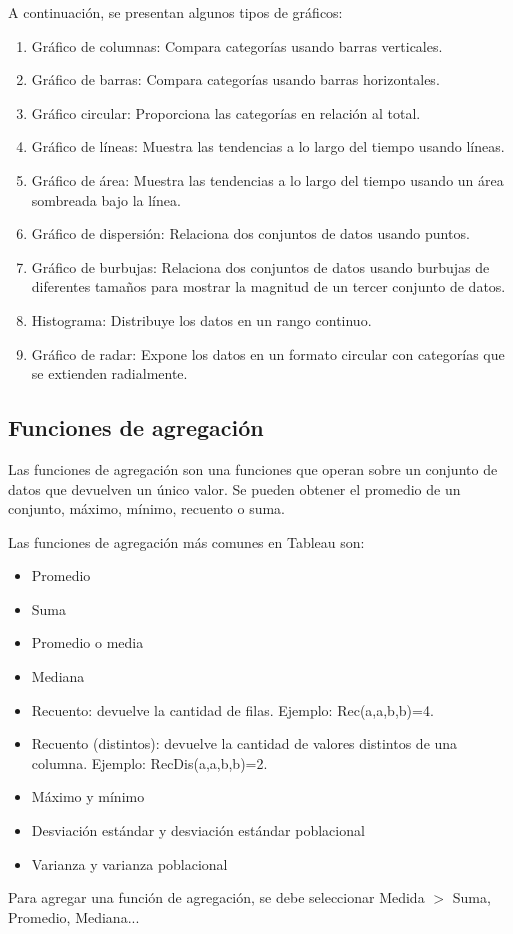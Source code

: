 \documentclass[a4paper, 12pt]{book}
\begin{document}
A continuación, se presentan algunos tipos de gráficos:
\begin{enumerate}
	\item Gráfico de columnas: Compara categorías usando barras verticales.
	\item Gráfico de barras: Compara categorías usando barras horizontales.
	\item Gráfico circular: Proporciona las categorías en relación al total.
	\item Gráfico de líneas: Muestra las tendencias a lo largo del tiempo usando líneas.
	\item Gráfico de área: Muestra las tendencias a lo largo del tiempo usando un área sombreada bajo la línea.
	\item Gráfico de dispersión: Relaciona dos conjuntos de datos usando puntos.
	\item Gráfico de burbujas: Relaciona dos conjuntos de datos usando burbujas de diferentes tamaños para mostrar la magnitud de un tercer conjunto de datos.
	\item Histograma: Distribuye los datos en un rango continuo.
	\item Gráfico de radar: Expone los datos en un formato circular con categorías que se extienden radialmente.
\end{enumerate}

\subsection{Funciones de agregación}
Las funciones de agregación son una funciones que operan sobre un conjunto de datos que devuelven un único valor. Se pueden obtener el promedio de un conjunto, máximo, mínimo, recuento o suma.

Las funciones de agregación más comunes en Tableau son:
\begin{itemize}
	\item Promedio
	\item Suma
	\item Promedio o media
	\item Mediana
	\item Recuento: devuelve la cantidad de filas. Ejemplo: Rec(a,a,b,b)=4.
	\item Recuento (distintos): devuelve la cantidad de valores distintos de una columna. Ejemplo: RecDis(a,a,b,b)=2.
	\item Máximo y mínimo
	\item Desviación estándar y desviación estándar poblacional
	\item Varianza y varianza poblacional
\end{itemize}
Para agregar una función de agregación, se debe seleccionar Medida $>$ Suma, Promedio, Mediana...
\end{document}
